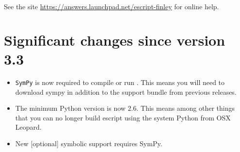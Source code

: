 See the site \url{https://answers.launchpad.net/escript-finley} for online help.

\section{Significant changes since version 3.3}
\begin{itemize}
 \item \texttt{SymPy} is now required to compile or run \escript. 
    This means you will need to download sympy in addition to the support bundle from previous releases.
 \item The minimum Python version is now $2.6$.   
This means among other things that you can no longer build escript using the system Python from OSX Leopard.
 \item New [optional] symbolic support requires SymPy.   
\end{itemize}

% 






